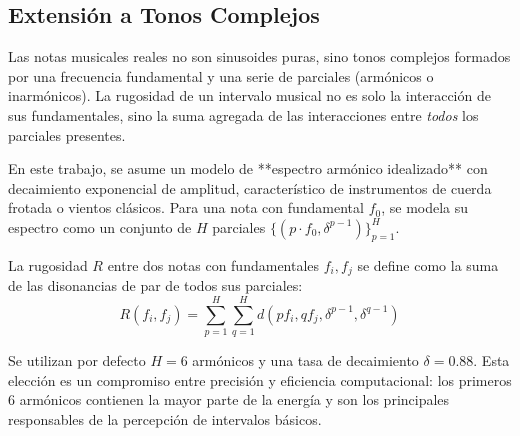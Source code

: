 \subsection{Extensión a Tonos Complejos}

Las notas musicales reales no son sinusoides puras, sino tonos complejos formados por una frecuencia fundamental y una serie de parciales (armónicos o inarmónicos). La rugosidad de un intervalo musical no es solo la interacción de sus fundamentales, sino la suma agregada de las interacciones entre \textit{todos} los parciales presentes.

En este trabajo, se asume un modelo de **espectro armónico idealizado** con decaimiento exponencial de amplitud, característico de instrumentos de cuerda frotada o vientos clásicos. Para una nota con fundamental $f_0$, se modela su espectro como un conjunto de $H$ parciales $\{(p \cdot f_0, \delta^{p-1})\}_{p=1}^H$.

\begin{definition}
La rugosidad $R$ entre dos notas con fundamentales $f_i, f_j$ se define como la suma de las disonancias de par de todos sus parciales:
\begin{equation}
\label{eq:complex_roughness}
R(f_i, f_j) = \sum_{p=1}^{H} \sum_{q=1}^{H} d(p f_i, q f_j, \delta^{p-1}, \delta^{q-1})
\end{equation}
\end{definition}

Se utilizan por defecto $H=6$ armónicos y una tasa de decaimiento $\delta=0.88$. Esta elección es un compromiso entre precisión y eficiencia computacional: los primeros 6 armónicos contienen la mayor parte de la energía y son los principales responsables de la percepción de intervalos básicos.

